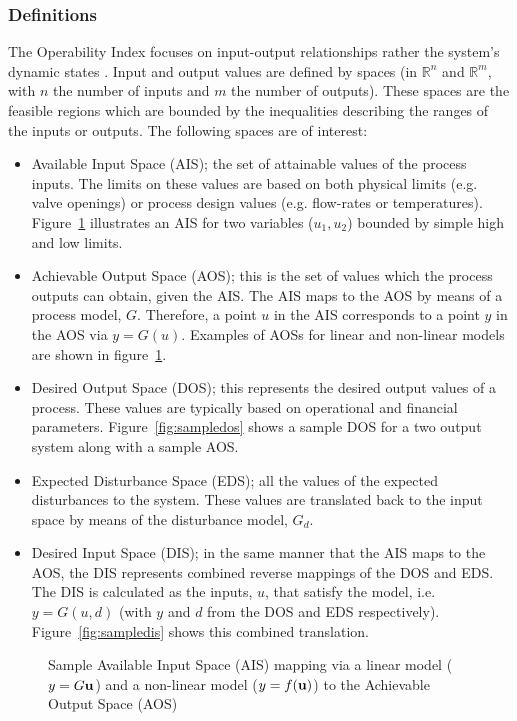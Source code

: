 \subsubsection{Definitions}
The Operability Index focuses on input-output relationships rather the system's dynamic states \citep{vinsonphd}. 
Input and output values are defined by spaces (in $\mathbb{R}^n$ and $\mathbb{R}^m$, with $n$ the number of inputs and $m$ the number of outputs). 
These spaces are the feasible regions which are bounded by the inequalities describing the ranges of the inputs or outputs. 
The following spaces are of interest:
\begin{itemize}
  \item Available Input Space (AIS); the set of attainable values of the process inputs. 
    The limits on these values are based on both physical limits (e.g.     valve openings) or process design values (e.g. flow-rates or temperatures). 
Figure~\ref{fig:sampleaisaos} illustrates an AIS for two variables ($u_1, u_2$) bounded by simple high and low limits.
  \item Achievable Output Space (AOS); this is the set of values which the process outputs can obtain, given the AIS. 
The AIS maps to the AOS by means of a process model, $G$. 
Therefore, a point $u$ in the AIS corresponds to a point $y$ in the AOS via $y=G(u)$. 
Examples of AOSs for linear and non-linear models are shown in figure~\ref{fig:sampleaisaos}.
  \item Desired Output Space (DOS); this represents the desired output values of a process. 
These values are typically based on operational and financial   parameters. 
Figure~\ref{fig:sampledos} shows a sample DOS for a two output    system along with a sample AOS.
  \item Expected Disturbance Space (EDS); all the values of the expected disturbances to the system. 
These values are translated back to the input space by means of the disturbance model, $G_d$.
  \item Desired Input Space (DIS); in the same manner that the AIS maps to the AOS, the DIS represents combined reverse mappings of the DOS and EDS.
The DIS is calculated as the inputs, $u$, that satisfy the model, i.e. $y=G(u,d)$ (with $y$ and $d$ from the DOS and EDS respectively).
Figure~\ref{fig:sampledis} shows this combined translation.
\end{itemize}

\begin{figure}[htbp]
  \centering
  \scalebox{1}{}
  \caption[Sample Available Input Space mapping to Achievable Output Space]{Sample Available Input Space (AIS) mapping via a linear model ($y=G{\bf {u}}$) and a non-linear model ($y=f({\bf {u}})$) to the Achievable Output Space (AOS)}
  \label{fig:sampleaisaos}
\end{figure}

